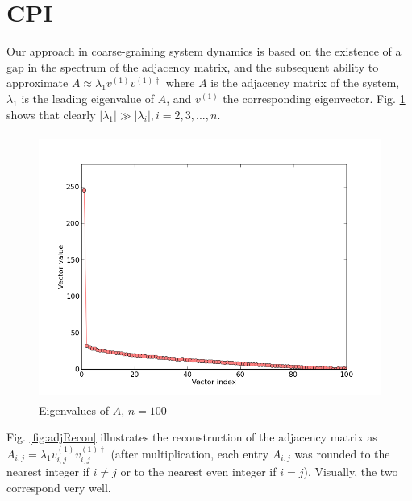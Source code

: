 \documentclass[11pt]{article}
\begin{document}
\clearpage
\section*{CPI}
Our approach in coarse-graining system dynamics is based on the existence of a gap in the spectrum of the adjacency matrix, and the subsequent ability to approximate $A\approx \lambda_{1}v^{(1)}v^{(1) \dagger}$ where $A$ is the adjacency matrix of the system, $\lambda_{1}$ is the leading eigenvalue of $A$, and $v^{(1)}$ the corresponding eigenvector. Fig. \ref{fig:spectralGap} shows that clearly $|\lambda_{1}| \gg |\lambda_{i}|, i=2,3,...,n$. 

\begin{figure}[h]
  \centering
  \includegraphics[height=87mm]{spectralGap100}
  \caption{Eigenvalues of $A$, $n=100$}
  \label{fig:spectralGap}
\end{figure}

Fig. \ref{fig:adjRecon} illustrates the reconstruction of the adjacency matrix as $A_{i,j}=\lambda_{1}v^{(1)}_{i,j}v^{(1) \dagger}_{i,j}$ (after multiplication, each entry $A_{i,j}$ was rounded to the nearest integer if $i\neq j$ or to the nearest even integer if $i=j$). Visually, the two correspond very well.
\end{document}
